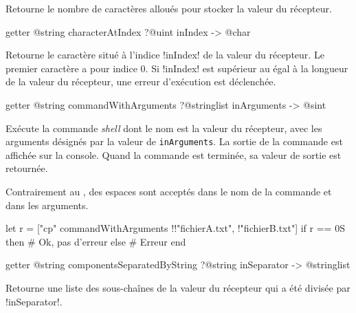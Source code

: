 Retourne le nombre de caractères alloués pour stocker la valeur du récepteur.








\begin{galgas3box}
getter @string characterAtIndex ?@uint inIndex -> @char
\end{galgas3box}

Retourne le caractère situé à l'indice \ggst!inIndex! de la valeur du récepteur. Le premier caractère a pour indice $0$. Si \ggst!inIndex! est supérieur au égal à la longueur de la valeur du récepteur, une erreur d'exécution est déclenchée.












\begin{galgas3box}
getter @string commandWithArguments ?@stringlist inArguments -> @sint
\end{galgas3box}
Exécute la commande \emph{shell} dont le nom est la valeur du récepteur, avec les arguments désignés par la valeur de \texttt{inArguments}. La sortie de la commande est affichée sur la console. Quand la commande est terminée, sa valeur de sortie est retournée.

Contrairement au , des espaces sont acceptés dans le nom de la commande et dans les arguments.

\begin{galgas3}
let r = ["cp" commandWithArguments !{!"fichierA.txt", !"fichierB.txt"}]
if r == 0S then
  # Ok, pas d'erreur
else
  # Erreur
end
\end{galgas3}
















\begin{galgas3box}
getter @string componentsSeparatedByString ?@string inSeparator -> @stringlist
\end{galgas3box}
Retourne une liste des sous-chaînes de la valeur du récepteur qui a été divisée par \ggst!inSeparator!.

